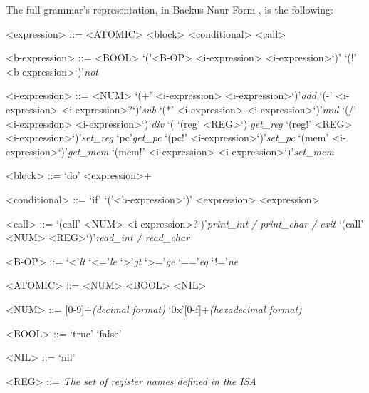 \noindent
The full grammar's representation, in Backus-Naur Form \parencite{Backus1959TheSA}, is the following:
%
\begin{grammar}
  <expression> ::= <ATOMIC>
    \alt <block>
    \alt <conditional>
    \alt <call>

  <b-expression> ::= <BOOL>
    \alt `('<B-OP> <i-expression> <i-expression>`)'
    \alt `(!' <b-expression>`)'\hfill\textit{not}

  <i-expression> ::= <NUM>
    \alt `(+' <i-expression> <i-expression>`)'\hfill\textit{add}
    \alt `(-' <i-expression> <i-expression>?`)'\hfill\textit{sub}
    \alt `(*' <i-expression> <i-expression>`)'\hfill\textit{mul}
    \alt `(/' <i-expression> <i-expression>`)'\hfill\textit{div}
    \alt `(%
    \alt `(reg' <REG>`)'\hfill\textit{get\_reg}
    \alt `(reg!' <REG> <i-expression>`)'\hfill\textit{set\_reg}
    \alt `pc'\hfill\textit{get\_pc}
    \alt `(pc!' <i-expression>`)'\hfill\textit{set\_pc}
    \alt `(mem' <i-expression>`)'\hfill\textit{get\_mem}
    \alt `(mem!' <i-expression> <i-expression>`)'\hfill\textit{set\_mem}

  <block> ::= `do' <expression>+

  <conditional> ::= `if' `('<b-expression>`)' <expression> <expression>

  <call> ::= `(call' <NUM> <i-expression>?`)'\hfill\textit{print\_int / print\_char / exit}
    \alt `(call' <NUM> <REG>`)'\hfill\textit{read\_int / read\_char}

  <B-OP> ::= `<'\hfill\textit{lt}
    \alt `<='\hfill\textit{le}
    \alt `>'\hfill\textit{gt}
    \alt `>='\hfill\textit{ge}
    \alt `=='\hfill\textit{eq}
    \alt `!='\hfill\textit{ne}

  <ATOMIC> ::= <NUM>
    \alt <BOOL>
    \alt <NIL>

  <NUM> ::= [0-9]+\hfill\textit{(decimal format)}
    \alt `0x'[0-f]+\hfill\textit{(hexadecimal format)}

  <BOOL> ::= `true'
    \alt `false'

  <NIL> ::= `nil'

  <REG> ::= \textit{The set of register names defined in the \gls{ISA}}
\end{grammar}


